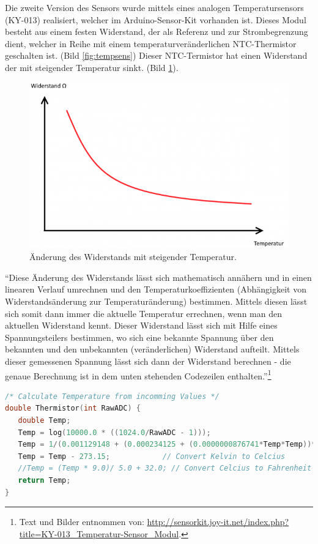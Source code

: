 Die zweite Version des Sensors wurde mittels eines analogen
Temperatursensors (KY-013) realisiert, welcher im Arduino-Sensor-Kit
vorhanden ist. Dieses Modul besteht aus einem festen Widerstand, der als
Referenz und zur Strombegrenzung dient, welcher in Reihe mit einem
temperaturveränderlichen NTC-Thermistor geschalten ist. (Bild \ref{fig:tempsens})
Dieser NTC-Termistor hat einen Widerstand der mit steigender Temperatur sinkt. (Bild \ref{fig:tempkurve}).

\begin{figure}
\centering
\includegraphics[width=.6\textwidth]{includes/sensor_pics/610px-KY-013_NTC-Kurve.png}
\caption{Änderung des Widerstands mit steigender
Temperatur.}
\label{fig:tempkurve}
\end{figure}

``Diese Änderung des Widerstands lässt sich mathematisch annähern und
in einen linearen Verlauf umrechnen und den Temperaturkoeffizienten
(Abhängigkeit von Widerstandsänderung zur Temperaturänderung)
bestimmen. Mittels diesen lässt sich somit dann immer die aktuelle
Temperatur errechnen, wenn man den aktuellen Widerstand kennt. Dieser
Widerstand lässt sich mit Hilfe eines Spannungsteilers bestimmen, wo
sich eine bekannte Spannung über den bekannten und den unbekannten
(veränderlichen) Widerstand aufteilt. Mittels dieser gemessenen
Spannung lässt sich dann der Widerstand berechnen - die genaue
Berechnung ist in dem unten stehenden Codezeilen
enthalten.''\footnote{Text und Bilder entnommen von:
\url{http://sensorkit.joy-it.net/index.php?title=KY-013_Temperatur-Sensor_Modul}.}

\begin{lstlisting}[language=C, caption=Umrechnung des Analogwerts in Temperatur.]
/* Calculate Temperature from incomming Values */
double Thermistor(int RawADC) {
   double Temp;
   Temp = log(10000.0 * ((1024.0/RawADC - 1)));
   Temp = 1/(0.001129148 + (0.000234125 + (0.0000000876741*Temp*Temp))*Temp);
   Temp = Temp - 273.15;            // Convert Kelvin to Celcius
   //Temp = (Temp * 9.0)/ 5.0 + 32.0; // Convert Celcius to Fahrenheit
   return Temp;
}
\end{lstlisting}


